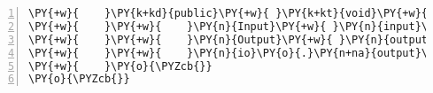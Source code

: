 \begin{Verbatim}[commandchars=\\\{\},numbers=left,firstnumber=1,stepnumber=1,frame=single,fontsize=\small]
\PY{+w}{    }\PY{k+kd}{public}\PY{+w}{ }\PY{k+kt}{void}\PY{+w}{ }\PY{n+nf}{run}\PY{o}{(}\PY{o}{)}\PY{+w}{ }\PY{k+kd}{throws}\PY{+w}{ }\PY{n}{Exception}\PY{+w}{ }\PY{o}{\PYZob{}}
\PY{+w}{    }\PY{+w}{    }\PY{n}{Input}\PY{+w}{ }\PY{n}{input}\PY{+w}{ }\PY{o}{=}\PY{+w}{ }\PY{n}{io}\PY{o}{.}\PY{n+na}{input}\PY{o}{(}\PY{o}{)}\PY{o}{;}
\PY{+w}{    }\PY{+w}{    }\PY{n}{Output}\PY{+w}{ }\PY{n}{output}\PY{+w}{ }\PY{o}{=}\PY{+w}{ }\PY{n}{process}\PY{o}{.}\PY{n+na}{process}\PY{o}{(}\PY{n}{input}\PY{o}{)}\PY{o}{;}
\PY{+w}{    }\PY{+w}{    }\PY{n}{io}\PY{o}{.}\PY{n+na}{output}\PY{o}{(}\PY{n}{output}\PY{o}{)}\PY{o}{;}
\PY{+w}{    }\PY{o}{\PYZcb{}}
\PY{o}{\PYZcb{}}
\end{Verbatim}

